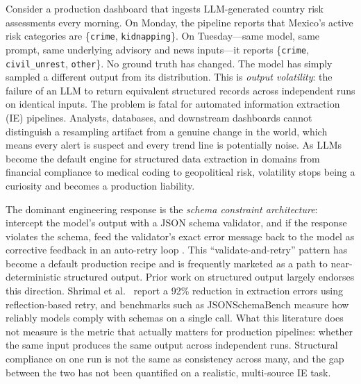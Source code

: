 \documentclass[sigconf]{acmart}
\begin{document}
Consider a production dashboard that ingests LLM-generated country risk assessments every morning. On Monday, the pipeline reports that Mexico's active risk categories are \{\texttt{crime}, \texttt{kidnapping}\}. On Tuesday---same model, same prompt, same underlying advisory and news inputs---it reports \{\texttt{crime}, \texttt{civil\_unrest}, \texttt{other}\}. No ground truth has changed. The model has simply sampled a different output from its distribution. This is \emph{output volatility}: the failure of an LLM to return equivalent structured records across independent runs on identical inputs. The problem is fatal for automated information extraction (IE) pipelines. Analysts, databases, and downstream dashboards cannot distinguish a resampling artifact from a genuine change in the world, which means every alert is suspect and every trend line is potentially noise. As LLMs become the default engine for structured data extraction in domains from financial compliance to medical coding to geopolitical risk, volatility stops being a curiosity and becomes a production liability.

The dominant engineering response is the \emph{schema constraint architecture}: intercept the model's output with a JSON schema validator, and if the response violates the schema, feed the validator's exact error message back to the model as corrective feedback in an auto-retry loop \cite{willard2023efficient, beurer2023prompting}. This ``validate-and-retry'' pattern has become a default production recipe and is frequently marketed as a path to near-deterministic structured output. Prior work on structured output largely endorses this direction. Shrimal et al.\ \cite{shrimal2025parse} report a 92\% reduction in extraction errors using reflection-based retry, and benchmarks such as JSONSchemaBench \cite{geng2025jsonschemabench} measure how reliably models comply with schemas on a single call. What this literature does not measure is the metric that actually matters for production pipelines: whether the same input produces the same output across independent runs. Structural compliance on one run is not the same as consistency across many, and the gap between the two has not been quantified on a realistic, multi-source IE task.
\end{document}
